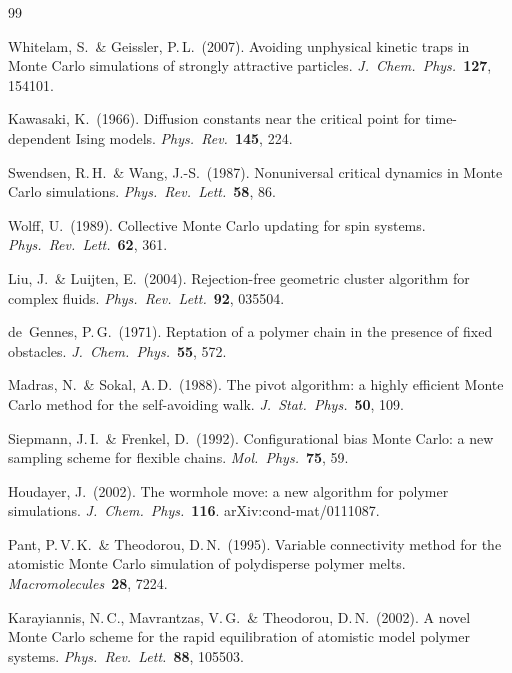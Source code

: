 \documentclass[10.5pt]{article}
\begin{document}
\begin{thebibliography}{99}

  Whitelam, S.\ \& Geissler, P.\,L.\ (2007).
  Avoiding unphysical kinetic traps in Monte Carlo simulations of strongly
  attractive particles.
  \textit{J.\ Chem.\ Phys.}\ \textbf{127}, 154101.

  Kawasaki, K.\ (1966).
  Diffusion constants near the critical point for time-dependent Ising models.
  \textit{Phys.\ Rev.}\ \textbf{145}, 224.

  Swendsen, R.\,H.\ \& Wang, J.-S.\ (1987).
  Nonuniversal critical dynamics in Monte Carlo simulations.
  \textit{Phys.\ Rev.\ Lett.}\ \textbf{58}, 86.

  Wolff, U.\ (1989).
  Collective Monte Carlo updating for spin systems.
  \textit{Phys.\ Rev.\ Lett.}\ \textbf{62}, 361.

  Liu, J.\ \& Luijten, E.\ (2004).
  Rejection-free geometric cluster algorithm for complex fluids.
  \textit{Phys.\ Rev.\ Lett.}\ \textbf{92}, 035504.

  de~Gennes, P.\,G.\ (1971).
  Reptation of a polymer chain in the presence of fixed obstacles.
  \textit{J.\ Chem.\ Phys.}\ \textbf{55}, 572.

  Madras, N.\ \& Sokal, A.\,D.\ (1988).
  The pivot algorithm: a highly efficient Monte Carlo method for the
  self-avoiding walk.
  \textit{J.\ Stat.\ Phys.}\ \textbf{50}, 109.

  Siepmann, J.\,I.\ \& Frenkel, D.\ (1992).
  Configurational bias Monte Carlo: a new sampling scheme for flexible chains.
  \textit{Mol.\ Phys.}\ \textbf{75}, 59.

  Houdayer, J.\ (2002).
  The wormhole move: a new algorithm for polymer simulations.
  \textit{J.\ Chem.\ Phys.}\ \textbf{116}.
  arXiv:cond-mat/0111087.

  Pant, P.\,V.\,K.\ \& Theodorou, D.\,N.\ (1995).
  Variable connectivity method for the atomistic Monte Carlo simulation of
  polydisperse polymer melts.
  \textit{Macromolecules}\ \textbf{28}, 7224.

  Karayiannis, N.\,C., Mavrantzas, V.\,G.\ \& Theodorou, D.\,N.\ (2002).
  A novel Monte Carlo scheme for the rapid equilibration of atomistic model
  polymer systems.
  \textit{Phys.\ Rev.\ Lett.}\ \textbf{88}, 105503.


\end{thebibliography}
\end{document}
